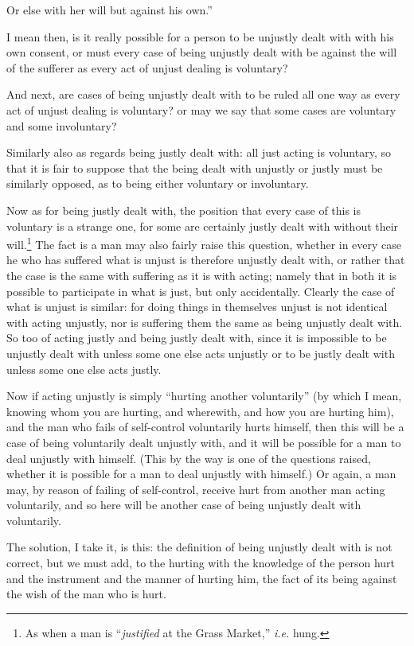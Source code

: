 Or else with her will but against his own.”

I mean then, is it really possible for a person to be unjustly dealt with with
his own consent, or must every case of being unjustly dealt with be against the
will of the sufferer as every act of unjust dealing is voluntary?

And next, are cases of being unjustly dealt with to be ruled all one way as
every act of unjust dealing is voluntary? or may we say that some cases are
voluntary and some involuntary?

Similarly also as regards being justly dealt with: all just acting is
voluntary, so that it is fair to suppose that the being dealt with unjustly or
justly must be similarly opposed, as to being either voluntary or involuntary.

Now as for being justly dealt with, the position that every case of this is
voluntary is a strange one, for some are certainly justly dealt with without
their will.\footnote{As when a man is “\emph{justified} at the Grass Market,”
\emph{i.e.} hung.}
The fact is a man may also fairly raise this question, whether in every case he
who has suffered what is unjust is therefore unjustly dealt with, or rather
that the case is the same with suffering as it is with acting; namely that in
both it is possible to participate in what is just, but only accidentally.
Clearly the case of what is unjust is similar: for doing things in themselves
unjust is not identical with acting unjustly, nor is suffering them the same as
being unjustly dealt with. So too of acting justly and being justly dealt with,
since it is impossible to be unjustly dealt with unless some one else acts
unjustly or to be justly dealt with unless some one else acts justly.

Now if acting unjustly is simply “hurting another voluntarily” (by
which I mean, knowing whom you are hurting, and wherewith, and how you are
hurting him), and the man who fails of self-control voluntarily hurts himself,
then this will be a case of being voluntarily dealt unjustly with, and it will
be possible for a man to deal unjustly with himself. (This by the way is one of
the questions raised, whether it is possible for a man to deal unjustly with
himself.) Or again, a man may, by reason of failing of self-control, receive
hurt from another man acting voluntarily, and so here will be another case of
being unjustly dealt with voluntarily.

The solution, I take it, is this: the definition of being unjustly dealt with
is not correct, but we must add, to the hurting with the knowledge of the
person hurt and the instrument and the manner of hurting him, the fact of its
being against the wish of the man who is hurt.

